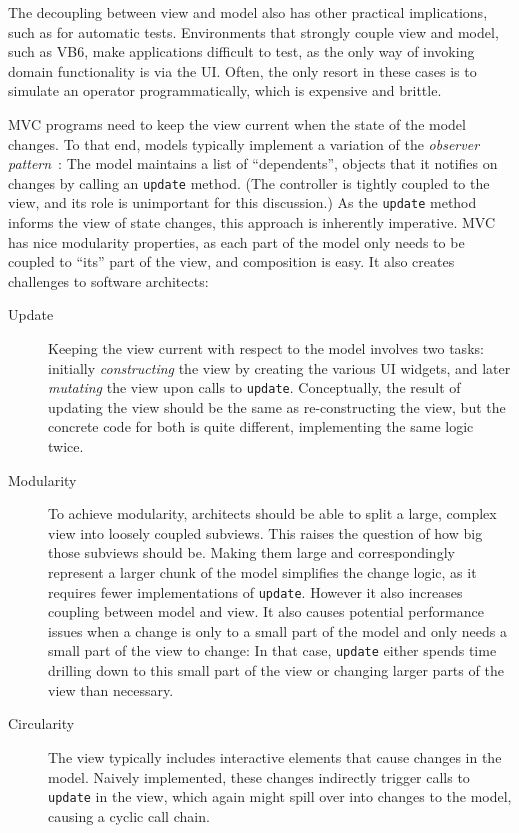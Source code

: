 \documentclass[sigplan,review,screen]{acmart}
\begin{document}
The decoupling between view and model also has other practical
implications, such as for automatic tests.  Environments that
strongly couple view and model, such as VB6, make applications
difficult to test, as the only way of invoking domain
functionality is via the UI.
Often, the only resort in these cases is to simulate an operator
programmatically, which is expensive and brittle.

MVC programs need to keep the view current when the state of the model
changes.  To that end, models typically implement a variation of the
\textit{observer pattern}~\cite{GoF}: The model maintains a list of
``dependents'', objects that it notifies on changes by calling
an \texttt{update} method.  (The controller is tightly coupled to the
view, and its role is unimportant for this discussion.)
As the \texttt{update} method informs the view of state changes, this
approach is inherently imperative.  MVC has nice modularity
properties, as each part of the model only needs to be coupled to
``its'' part of the view, and composition is easy.
It also creates challenges to
software architects:
\label{sec:challenges}
%
\begin{description}
\item[\hypertarget{challenge:update}{Update}] Keeping the view current with respect to the model involves two
  tasks: initially \emph{constructing} the view by creating the
  various UI widgets, and later \emph{mutating} the view upon calls to
  \texttt{update}.  Conceptually, the result of updating the view
  should be the same as re-constructing the view, but the concrete
  code for both is quite different, implementing the same logic twice.
\item[\hypertarget{challenge:modularity}{Modularity}] To achieve modularity, architects should be able to split a large,
  complex view into loosely coupled subviews.  This raises the
  question of how big those subviews should be. Making them large and
  correspondingly represent a larger chunk of the model
  simplifies the change logic, as it requires fewer implementations of
  \texttt{update}. However it also increases coupling between model
  and view.  It also causes potential performance issues when 
  a change is only to a small part of the model and only needs a
  small part of the view to change: In that case, \texttt{update}
  either spends time drilling down to this small part of the view or
  changing larger parts of the view than necessary.
\item[\hypertarget{challenge:circularity}{Circularity}] The view typically
  includes interactive elements that cause changes in the model.
  Naively implemented, these changes indirectly trigger calls to
  \texttt{update} in the view, which again might spill over into
  changes to the model, causing a cyclic call chain.
\end{description}
\end{document}

